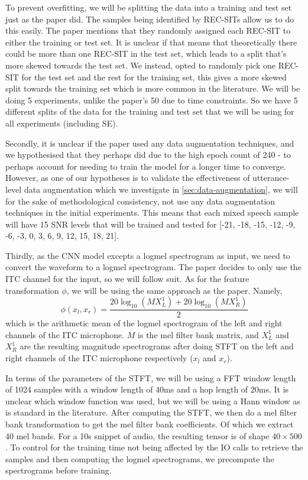 \documentclass[logo,bsc,singlespacing,parskip,online]{infthesis}
\begin{document}
To prevent overfitting, we will be splitting the data into a training and test set just as the paper did.
The samples being identified by REC-SITs allow us to do this easily. The paper mentions that they randomly 
assigned each REC-SIT to either the training or test set. It is unclear if 
that means that theoretically there could be more than one REC-SIT in the test set, which 
leads to a split that's more skewed towards the test set. We instead, opted to randomly pick 
one REC-SIT for the test set and the rest for the training set, this gives a more 
skewed split towards the training set which is more common in the literature.
We will be doing 5 experiments, unlike the paper's 50 due to time constraints. So 
we have 5 different splits of the data for the training and test set that we will be using 
for all experiments (including SE).

Secondly, it is unclear if the paper used any data augmentation techniques, and we 
hypothesised that they perhaps did due to the high epoch count of 240 - to perhaps 
account for needing to train the model for a longer time to converge. However,
as one of our hypotheses is to validate the effectiveness of utterance-level data 
augmentation which we investigate in \ref{sec:data-augmentation}, we will 
for the sake of methodological consistency, not use any data augmentation techniques in the 
initial experiments. This means that each mixed speech sample will have 15
SNR levels that will be trained and tested for [-21, -18, -15, -12, -9, -6, -3, 0, 3, 6, 9, 12, 15, 18, 21].

Thirdly, as the CNN model excepts a logmel spectrogram as input, we need to convert the waveform
to a logmel spectrogram. The paper decides to only use the ITC channel for the input, so we 
will follow suit.
As for the feature transformation \(\phi\), we will be using the same approach as the paper. Namely, 
\begin{equation}
\phi(x_l, x_r) = \frac{20\log_{10}\left(M X_{L}^{1} \right) + 20\log_{10}\left(M X_{R}^{1}\right)}{2}
\label{eq:logmel}
\end{equation}
which is the arithmetic mean of the logmel spectrogram of the left and right channels of the ITC microphone.
$M$ is the mel filter bank matrix, and $X_{L}^{1}$ and $X_{R}^{1}$ are
the resulting magnitude spectrograms after doing STFT on the left and right channels of the ITC microphone respectively ($x_l$ and $x_r$).

In terms of the parameters of the STFT, we will be using a FFT window length of 1024 samples with a window length of 40ms and a hop length of 20ms. It is 
unclear which window function was used, but we will be using a Hann window as is standard in the literature.
After computing the STFT, we then do a mel filter bank transformation to get the mel filter bank coefficients. 
Of which we extract 40 mel bands. For a 10s snippet of audio, the resulting tensor is of shape $40 \times 500$.
To control for the training time not being affected by the IO 
calls to retrieve the samples and then computing the logmel spectrograms,
we precompute the spectrograms before training.
\end{document}
